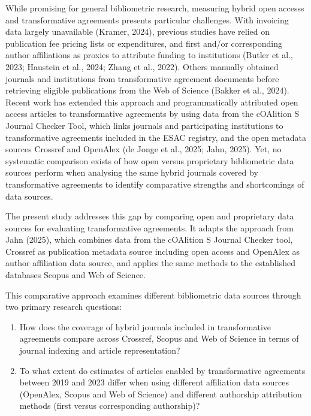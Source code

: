 \documentclass[a4paper,man,floatsintext,longtable,noextraspace,10pt]{apa6}
\begin{document}
While promising for general bibliometric research, measuring hybrid open
accesss and transformative agreements presents particular challenges.
With invoicing data largely unavailable (Kramer, 2024), previous studies
have relied on publication fee pricing lists or expenditures, and first
and/or corresponding author affiliations as proxies to attribute funding
to institutions (Butler et al., 2023; Haustein et al., 2024; Zhang et
al., 2022). Others manually obtained journals and institutions from
transformative agreement documents before retrieving eligible
publications from the Web of Science (Bakker et al., 2024). Recent work
has extended this approach and programmatically attributed open access
articles to transformative agreements by using data from the cOAlition S
Journal Checker Tool, which links journals and participating
institutions to transformative agreements included in the ESAC registry,
and the open metadata sources Crossref and OpenAlex (de Jonge et al.,
2025; Jahn, 2025). Yet, no systematic comparison exists of how open
versus proprietary bibliometric data sources perform when analysing the
same hybrid journals covered by transformative agreements to identify
comparative strengths and shortcomings of data sources.

The present study addresses this gap by comparing open and proprietary
data sources for evaluating transformative agreements. It adapts the
approach from Jahn (2025), which combines data from the cOAlition S
Journal Checker tool, Crossref as publication metadata source including
open access and OpenAlex as author affiliation data source, and applies
the same methods to the established databases Scopus and Web of Science.

This comparative approach examines different bibliometric data sources
through two primary research questions:

\begin{enumerate}
\def\labelenumi{\arabic{enumi}.}
\item
  How does the coverage of hybrid journals included in transformative
  agreements compare across Crossref, Scopus and Web of Science in terms
  of journal indexing and article representation?
\item
  To what extent do estimates of articles enabled by transformative
  agreements between 2019 and 2023 differ when using different
  affiliation data sources (OpenAlex, Scopus and Web of Science) and
  different authorship attribution methods (first versus corresponding
  authorship)?
\end{enumerate}
\end{document}
